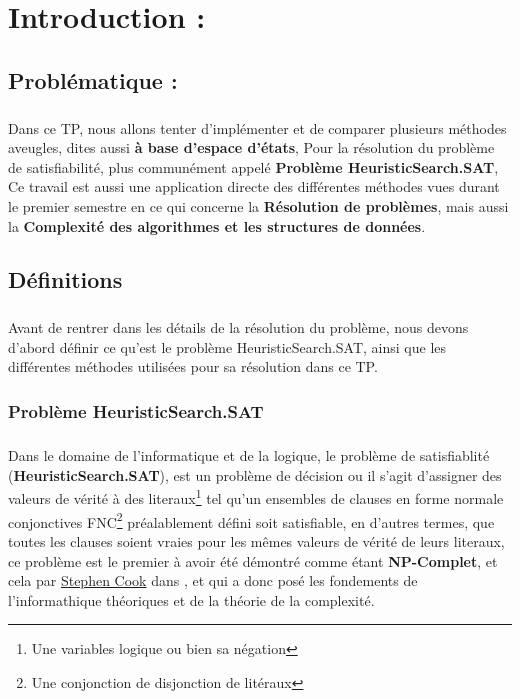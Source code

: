 \chapter{Introduction : }
\section{Problématique : }
\paragraph{}
Dans ce TP, nous allons tenter d'implémenter et de comparer plusieurs méthodes aveugles, dites aussi \textbf{à base d'espace d'états}, Pour la résolution du problème de satisfiabilité, plus communément appelé \textbf{Problème HeuristicSearch.SAT}, Ce travail est aussi une application directe des différentes méthodes vues durant le premier semestre en ce qui concerne la \textbf{Résolution de problèmes}, mais aussi la \textbf{Complexité des algorithmes et les structures de données}.
\section{Définitions}
\paragraph{}
Avant de rentrer dans les détails de la résolution du problème, nous devons d'abord définir ce qu'est le problème HeuristicSearch.SAT, ainsi que les différentes méthodes utilisées pour sa résolution dans ce TP.
\subsection{Problème HeuristicSearch.SAT}
\paragraph{}
Dans le domaine de l'informatique et de la logique, le problème de satisfiablité (\textbf{HeuristicSearch.SAT}), est un problème de décision ou il s'agit d'assigner des valeurs de vérité à des literaux\footnote{Une variables logique ou bien sa négation} tel qu'un ensembles de clauses en forme normale conjonctives FNC\footnote{Une conjonction de disjonction de litéraux} préalablement défini soit satisfiable, en d'autres termes, que toutes les clauses soient vraies pour les mêmes valeurs de vérité de leurs literaux, ce problème est le premier à avoir été démontré comme étant \textbf{NP-Complet}, et cela par \href{https://en.wikipedia.org/wiki/Stephen_Cook}{Stephen Cook} dans \cite{cook}, et qui a donc posé les fondements de l'informathique théoriques et de la théorie de la complexité.
\newpage
